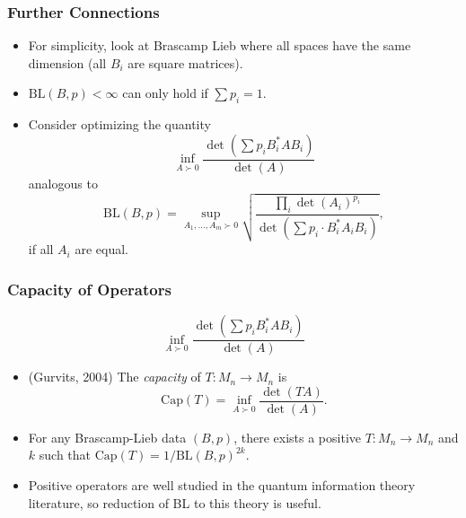\documentclass[usenames,dvipsnames,12pt]{beamer}
\begin{document}
\begin{frame}
    \frametitle{Further Connections}

    \begin{itemize}
        \item For simplicity, look at Brascamp Lieb where all spaces have the same dimension (all $B_i$ are square matrices). 

        \pause
        \item $\text{BL}(B,p) < \infty$ can only hold if $\sum p_i = 1$.

        \pause
        \item Consider optimizing the quantity
        \[ \inf_{A \succ 0} \frac{\det(\sum p_i B_i^* A B_i)}{\det(A)}  \]
        analogous to
        \[ \text{BL}(B,p) = \sup_{A_1,\dots,A_m \succ 0} \sqrt{ \frac{\prod_i \det(A_i)^{p_i}}{\det(\sum p_i \cdot B_i^* A_i B_i)}}, \]
        if all $A_i$ are equal.
    \end{itemize}
\end{frame}



\begin{frame}
    \frametitle{Capacity of Operators}

    \[ \inf_{A \succ 0} \frac{\det(\sum p_i B_i^* A B_i)}{\det(A)}  \]

    \begin{itemize}
        \pause
        \item (Gurvits, 2004) The \emph{capacity} of $T: M_n \to M_n$ is
        \[ \text{Cap}(T) = \inf_{A \succ 0} \frac{\det(TA)}{\det(A)}. \]

        \pause
        \item For any Brascamp-Lieb data $(B,p)$, there exists a positive $T: M_n \to M_n$ and $k$ such that $\text{Cap}(T) = 1/\text{BL}(B,p)^{2k}$.

        \pause
        \item Positive operators are well studied in the quantum information theory literature, so reduction of BL to  this theory is useful.
    \end{itemize}
\end{frame}
\end{document}
